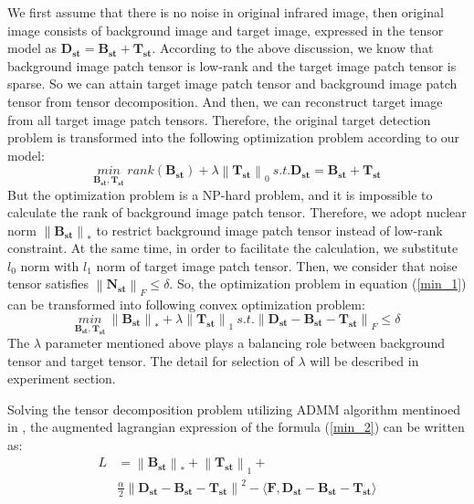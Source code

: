 \documentclass[journal]{IEEEtran}
\begin{document}
We first assume that there is no noise in original infrared image, then original image consists of background image and target image, expressed in the tensor model as $\bm{D_{st}}=\bm{B_{st}}+\bm{T_{st}}$. According to the above discussion, we know that background image patch tensor is low-rank and the target image patch tensor is sparse. So we can attain target image patch tensor and background image patch tensor from tensor decomposition. And then, we can reconstruct target image from all target image patch tensors. Therefore, the original target detection problem is transformed into the following optimization problem according to our model:
\begin{equation}
  \underset{\bm{B_{st}},\bm{T_{st}}}{min} \ rank(\bm{B_{st}}) + \lambda \left \| \bm{T_{st}} \right \|_0 \ s.t. \bm{D_{st}}=\bm{B_{st}}+\bm{T_{st}}
  \label{min_1}
\end{equation}
But the optimization problem is a NP-hard problem, and it is impossible to calculate the rank of background image patch tensor. Therefore, we adopt nuclear norm $\left \| \bm{B_{st}} \right \|_*$ to restrict background image patch tensor instead of low-rank constraint. At the same time, in order to facilitate the calculation, we substitute $l_0$ norm with $l_1$ norm of target image patch tensor. Then, we consider that noise tensor satisfies $\left \| \bm{N_{st}}\right \|_F \leq \delta$. So, the optimization problem in equation (\ref{min_1}) can be transformed into following convex optimization problem:
\begin{equation}
  \underset{\bm{B_{st}},\bm{T_{st}}}{min} \ \left \| \bm{B_{st}} \right \|_* + \lambda \left \| \bm{T_{st}} \right \|_1 \ s.t. \left \|\bm{D_{st}}-\bm{B_{st}}-\bm{T_{st}} \right \|_F\leq \delta
  \label{min_2}
\end{equation}
The $\lambda$ parameter mentioned above plays a balancing role between background tensor and target tensor. The detail for selection of $\lambda$ will be described in experiment section.

Solving the tensor decomposition problem utilizing ADMM algorithm mentinoed in \cite{dai2017reweighted}, the augmented lagrangian expression of the formula (\ref{min_2}) can be written as:
\begin{equation}
  \begin{split}
    L & = \left \|\bm{B_{st}} \right \| _* +\left \|\bm{T_{st}} \right \| _1 + \\
    & \frac{\alpha}{2} \left \|\bm{D_{st}}-\bm{B_{st}}-\bm{T_{st}} \right \| ^2 - \langle \bm{F},\bm{D_{st}}-\bm{B_{st}}-\bm{T_{st}} \rangle
  \end{split}
\end{equation}
\end{document}
